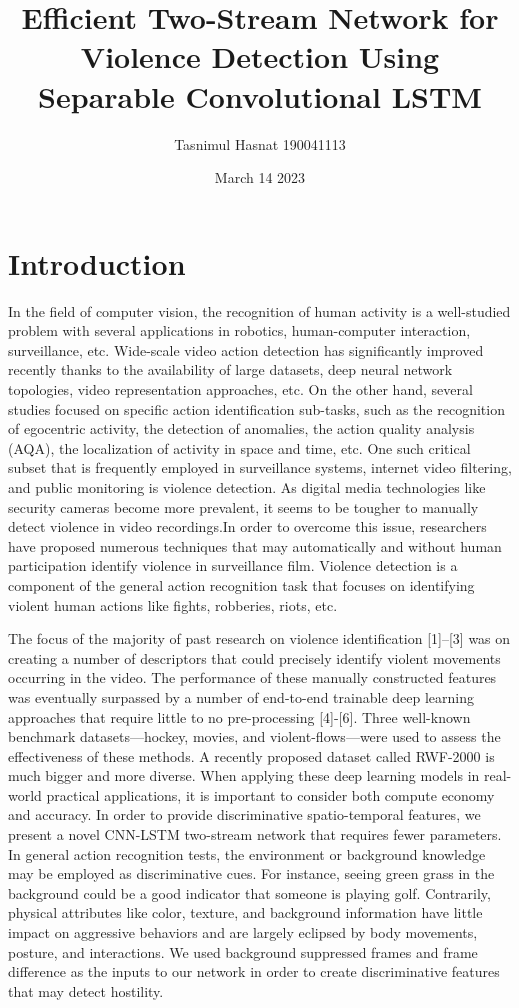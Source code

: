 \documentclass{article}
\title{Efficient Two-Stream Network for Violence
Detection Using Separable Convolutional LSTM}
\author{Tasnimul Hasnat 190041113}
\date{March 14 2023}
\begin{document}
\maketitle

\section{Introduction}
In the field of computer vision, the recognition of human activity is a well-studied problem with several applications in robotics, human-computer interaction, surveillance, etc.
Wide-scale video action detection has significantly improved recently thanks to the availability of large datasets, deep neural network topologies, video representation approaches, etc.
On the other hand, several studies focused on specific action identification sub-tasks, such as the recognition of egocentric activity, the detection of anomalies, the action quality analysis (AQA), the localization of activity in space and time, etc.
One such critical subset that is frequently employed in surveillance systems, internet video filtering, and public monitoring is violence detection.
As digital media technologies like security cameras become more prevalent, it seems to be tougher to manually detect violence in video recordings.In order to overcome this issue, researchers have proposed numerous techniques that may automatically and without human participation identify violence in surveillance film.
Violence detection is a component of the general action recognition task that focuses on identifying violent human actions like fights, robberies, riots, etc.  


The focus of the majority of past research on violence identification [1]–[3] was on creating a number of descriptors that could precisely identify violent movements occurring in the video.
The performance of these manually constructed features was eventually surpassed by a number of end-to-end trainable deep learning approaches that require little to no pre-processing [4]-[6].
Three well-known benchmark datasets—hockey, movies, and violent-flows—were used to assess the effectiveness of these methods.
A recently proposed dataset called RWF-2000 is much bigger and more diverse.
When applying these deep learning models in real-world practical applications, it is important to consider both compute economy and accuracy. In order to provide discriminative spatio-temporal features, we present a novel CNN-LSTM two-stream network that requires fewer parameters.
In general action recognition tests, the environment or background knowledge may be employed as discriminative cues.
For instance, seeing green grass in the background could be a good indicator that someone is playing golf.
Contrarily, physical attributes like color, texture, and background information have little impact on aggressive behaviors and are largely eclipsed by body movements, posture, and interactions. We used background suppressed frames and frame difference as the inputs to our network in order to create discriminative features that may detect hostility.
\end{document}

